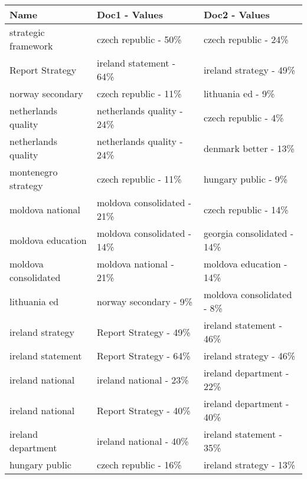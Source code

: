 \begin{tabular}{lll}
\hline
 Name                               & Doc1 - Values                            & Doc2 - Values              \\
\hline
 strategic framework                & czech republic - 50\%                     & czech republic - 24\%       \\
 Report Strategy                    & ireland statement - 64\%                  & ireland strategy - 49\%     \\
 norway secondary                   & czech republic - 11\%                     & lithuania ed - 9\%          \\
 netherlands quality                & netherlands quality - 24\%                & czech republic - 4\%        \\
 netherlands quality                & netherlands quality - 24\%                & denmark better - 13\%       \\
 montenegro strategy                & czech republic - 11\%                     & hungary public - 9\%        \\
 moldova national                   & moldova consolidated - 21\%               & czech republic - 14\%       \\
 moldova education                  & moldova consolidated - 14\%               & georgia consolidated - 14\% \\
 moldova consolidated               & moldova national - 21\%                   & moldova education - 14\%    \\
 lithuania ed                       & norway secondary - 9\%                    & moldova consolidated - 8\%  \\
 ireland strategy                   & Report Strategy - 49\%                    & ireland statement - 46\%    \\
 ireland statement                  & Report Strategy - 64\%                    & ireland strategy - 46\%     \\
 ireland national                   & ireland national - 23\%                   & ireland department - 22\%   \\
 ireland national                   & Report Strategy - 40\%                    & ireland department - 40\%   \\
 ireland department                 & ireland national - 40\%                   & ireland statement - 35\%    \\
 hungary public                     & czech republic - 16\%                     & ireland strategy - 13\%     \\

\end{tabular}
